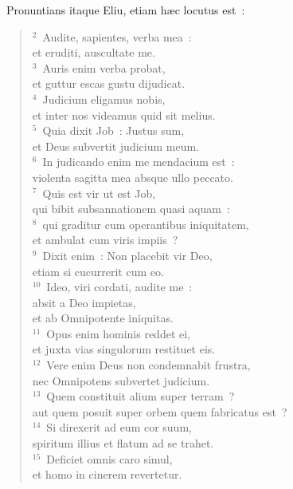 ~\lettrine[lines=10,image=true,loversize=0.05,lraise=-0.03]{P}{}ronuntians itaque Eliu, etiam h\ae c locutus est~:
\begin{flushleft}\begin{verse}\vspace{6pt}${}^{2}$~Audite, sapientes, verba mea~:\\ et eruditi, auscultate me.\\
${}^{3}$~Auris enim verba probat,\\ et guttur escas gustu dijudicat.\\
${}^{4}$~Judicium eligamus nobis,\\ et inter nos videamus quid sit melius.\\
${}^{5}$~Quia dixit Job~: Justus sum,\\ et Deus subvertit judicium meum.\\
${}^{6}$~In judicando enim me mendacium est~:\\ violenta sagitta mea absque ullo peccato.\\
${}^{7}$~Quis est vir ut est Job,\\ qui bibit subsannationem quasi aquam~:\\
${}^{8}$~qui graditur cum operantibus iniquitatem,\\ et ambulat cum viris impiis~?\\
${}^{9}$~Dixit enim~: Non placebit vir Deo,\\ etiam si cucurrerit cum eo.\\
${}^{10}$~Ideo, viri cordati, audite me~:\\ absit a Deo impietas,\\ et ab Omnipotente iniquitas.\\
${}^{11}$~Opus enim hominis reddet ei,\\ et juxta vias singulorum restituet eis.\\
${}^{12}$~Vere enim Deus non condemnabit frustra,\\ nec Omnipotens subvertet judicium.\\
${}^{13}$~Quem constituit alium super terram~?\\ aut quem posuit super orbem quem fabricatus est~?\\
${}^{14}$~Si direxerit ad eum cor suum,\\ spiritum illius et flatum ad se trahet.\\
${}^{15}$~Deficiet omnis caro simul,\\ et homo in cinerem revertetur.\\

\end{verse}
\end{flushleft}
